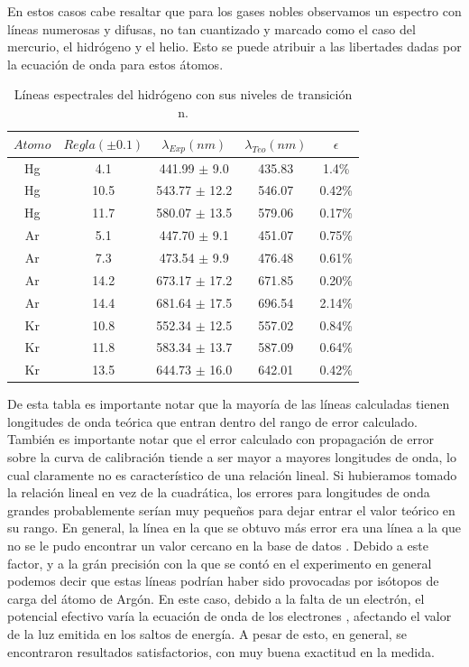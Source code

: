 \documentclass[%
 reprint,
 amsmath,amssymb,
 aps,
]{revtex4-1}
\begin{document}
En estos casos cabe resaltar que para los gases nobles observamos un espectro con líneas numerosas y difusas, no tan cuantizado y marcado como el caso del mercurio, el hidrógeno y el helio. Esto se puede atribuir a las libertades dadas por la ecuación de onda para estos átomos.\\

\begin{table}[h!]
\centering
 \begin{tabular}{|c|c|c|c|c|} 
 \hline
 $Atomo$ & $Regla (\pm0.1) $ & $\lambda_{Exp} (nm)$ & $\lambda_{Teo} (nm)$ & $\epsilon$\\ [0.5ex] 
 \hline\hline
 Hg & 4.1  &	441.99 $\pm$ 9.0  & 435.83 & 1.4\% \\
 Hg & 10.5 &	543.77 $\pm$ 12.2 & 546.07 & 0.42\% \\
 Hg & 11.7 &	580.07 $\pm$ 13.5 & 579.06 & 0.17\% \\
 \hline
 Ar & 5.1  &447.70 $\pm$ 9.1  & 451.07 & 0.75\% \\
 Ar & 7.3  &473.54 $\pm$ 9.9  & 476.48 & 0.61\% \\
 Ar & 14.2 &673.17 $\pm$ 17.2 & 671.85 & 0.20\% \\
 Ar & 14.4 &	681.64 $\pm$ 17.5 & 696.54 & 2.14\% \\
 \hline
 Kr & 10.8 &	 552.34  $\pm$ 12.5 & 557.02 & 0.84\% \\
 Kr & 11.8 &	 583.34  $\pm$ 13.7 & 587.09 & 0.64\% \\
 Kr & 13.5 &	 644.73  $\pm$ 16.0 & 642.01 & 0.42\% \\
[1ex] 
 \hline
 \end{tabular}
 \caption{Líneas espectrales del hidrógeno con sus niveles de transición n.}
 \label{table:otros}
\end{table}

De esta tabla es importante notar que la mayoría de las líneas calculadas tienen longitudes de onda teórica que entran dentro del rango de error calculado. También es importante notar que el error calculado con propagación de error sobre la curva de calibración tiende a ser mayor a mayores longitudes de onda, lo cual claramente no es característico de una relación lineal. Si hubieramos tomado la relación lineal en vez de la cuadrática, los errores para longitudes de onda grandes probablemente serían muy pequeños para dejar entrar el valor teórico en su rango. En general, la línea en la que se obtuvo más error era una línea a la que no se le pudo encontrar un valor cercano en la base de datos \cite{base}. Debido a este factor, y a la grán precisión con la que se contó en el experimento en general podemos decir que estas líneas podrían haber sido provocadas por isótopos de carga del átomo de Argón. En este caso, debido a la falta de un electrón, el potencial efectivo varía la ecuación de onda de los electrones , afectando el valor de la luz emitida en los saltos de energía. A pesar de esto, en general, se encontraron resultados satisfactorios, con muy buena exactitud en la medida.\\
\end{document}
